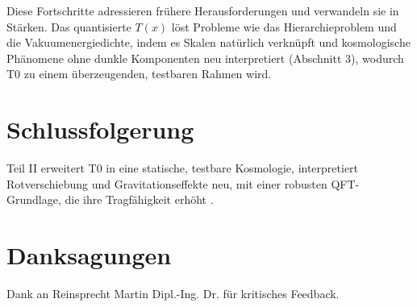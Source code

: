 \documentclass[12pt,a4paper]{article}
\newenvironment{acknowledgments}
{\section*{Danksagungen}}
{\vspace{1em}}
\newcommand{\Tfield}{T(x)}
\begin{document}
	Diese Fortschritte adressieren frühere Herausforderungen und verwandeln sie in Stärken. Das quantisierte \(\Tfield\) löst Probleme wie das Hierarchieproblem und die Vakuumenergiedichte, indem es Skalen natürlich verknüpft und kosmologische Phänomene ohne dunkle Komponenten neu interpretiert (Abschnitt 3), wodurch T0 zu einem überzeugenden, testbaren Rahmen wird.
	
	\section{Schlussfolgerung}
	\label{sec:conclusion}
	
	Teil II erweitert T0 in eine statische, testbare Kosmologie, interpretiert Rotverschiebung und Gravitationseffekte neu, mit einer robusten QFT-Grundlage, die ihre Tragfähigkeit erhöht \cite{pascher_perspective_2025}.
	
	\begin{acknowledgments}
		Dank an Reinsprecht Martin Dipl.-Ing. Dr. für kritisches Feedback.
	\end{acknowledgments}
	
\end{document}
